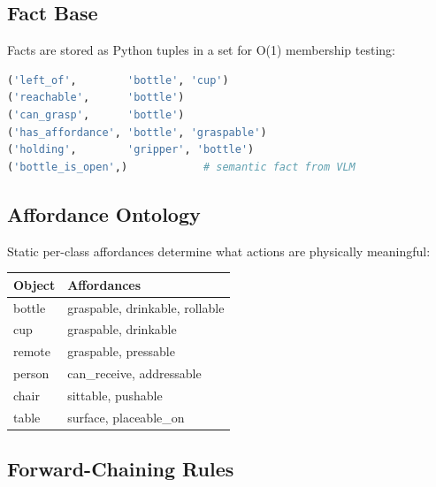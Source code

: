 \subsection{Fact Base}

Facts are stored as Python tuples in a set for O(1) membership testing:
\begin{lstlisting}[language=Python]
('left_of',        'bottle', 'cup')
('reachable',      'bottle')
('can_grasp',      'bottle')
('has_affordance', 'bottle', 'graspable')
('holding',        'gripper', 'bottle')
('bottle_is_open',)            # semantic fact from VLM
\end{lstlisting}

\subsection{Affordance Ontology}

Static per-class affordances determine what actions are physically meaningful:
\begin{center}
\small
\begin{tabular}{ll}
\toprule
\textbf{Object} & \textbf{Affordances} \\
\midrule
bottle  & graspable, drinkable, rollable \\
cup     & graspable, drinkable \\
remote  & graspable, pressable \\
person  & can\_receive, addressable \\
chair   & sittable, pushable \\
table   & surface, placeable\_on \\
\bottomrule
\end{tabular}
\end{center}

\subsection{Forward-Chaining Rules}

